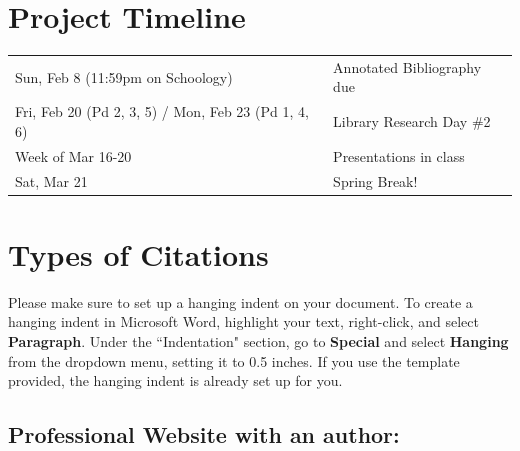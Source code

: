 \documentclass[10pt]{exam}
\begin{document}
\section*{Project Timeline}

\begin{tabular}{ll}
  Sun, Feb 8 (11:59pm on Schoology) & 
  Annotated Bibliography due
  \\[0.5em]
  Fri, Feb 20 (Pd 2, 3, 5) / Mon, Feb 23 (Pd 1, 4, 6)& 
  Library Research Day \#2
  \\[0.5em]
  Week of Mar 16-20 & 
  Presentations in class
  \\[0.5em]
  Sat, Mar 21 &
  Spring Break!
\end{tabular}


\pagebreak

\section*{Types of Citations}\label{types-of-citations}

\newenvironment{examplecitation}{
  \begin{Sbox}\begin{minipage}{6.3in}
    \doublespacing
    \textbf{Example:}
    
    \begin{hangparas}{.5in}{1}
}{
    \end{hangparas}
    \vspace{1em}
  \end{minipage}\end{Sbox}
  \doublebox{\TheSbox}
}

\newenvironment{mycitation}{
    \doublespacing    
    \begin{hangparas}{.25in}{1}
      \noindent
}{
    \end{hangparas}
}

Please make sure to set up a hanging indent on your document.  To create a hanging indent in Microsoft Word, highlight your text, right-click, and select \textbf{Paragraph}. Under the ``Indentation" section, go to \textbf{Special} and select \textbf{Hanging} from the dropdown menu, setting it to 0.5 inches.  If you use the template provided, the hanging indent is already set up for you.

\subsection*{Professional Website with an author:}
\end{document}
